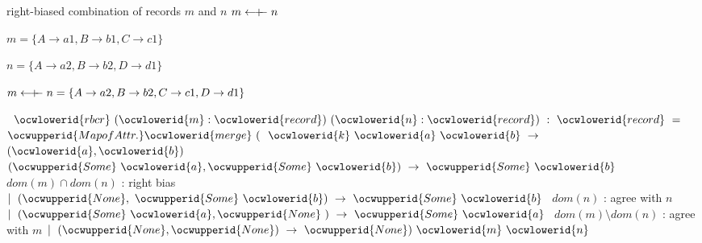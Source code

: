 \documentclass[12pt]{article}
\begin{document}
\ocwendcode{}\ocwindent{0.00em}
right-biased combination of records $m$ and $n$ 
\ocweol
\ocwindent{0.00em}
$m \mathrel{\leftarrow\mkern-7mu+\mkern-7mu-} n$

  $m =          \{ A \to a1, B \to b1, C \to c1\}$

  $n =          \{ A \to a2, B \to b2,          D \to d1\}$

  $m \mathrel{\leftarrow\mkern-7mu+\mkern-7mu-} n  = \{ A \to a2, B \to b2, C \to c1,D \to d1\}$

 
\ocweol
\label{rellens.ml:12776}%
\medskip
\ocwbegincode{}\ocwindent{0.00em}
~$\ocwlowerid{rbcr}~(\ocwlowerid{m}:\ocwlowerid{record})~(\ocwlowerid{n}:\ocwlowerid{record})~:~\ocwlowerid{record}~=~$\ocweol
\ocwindent{1.00em}
$\ocwupperid{MapofAttr.}\ocwlowerid{merge}~($~$\ocwlowerid{k}~\ocwlowerid{a}~\ocwlowerid{b}~\rightarrow{}~$~$(\ocwlowerid{a},\ocwlowerid{b})~$\ocweol
\ocwindent{1.00em}
$(\ocwupperid{Some}~\ocwlowerid{a},\ocwupperid{Some}~\ocwlowerid{b})~\rightarrow{}~\ocwupperid{Some}~\ocwlowerid{b}~$\ocwbc{} $dom(m) \cap  dom(n)$ : right bias \ocwec{}\ocweol
\ocwindent{0.00em}
$\mid{}~(\ocwupperid{None},~\ocwupperid{Some}~\ocwlowerid{b})~\rightarrow{}~\ocwupperid{Some}~\ocwlowerid{b}~$\ocwbc{}              $dom(n)$ : agree with $n$ \ocwec{}\ocweol
\ocwindent{0.00em}
$\mid{}~(\ocwupperid{Some}~\ocwlowerid{a},\ocwupperid{None}~)~\rightarrow{}~\ocwupperid{Some}~\ocwlowerid{a}~$\ocwbc{} $dom(m)\setminus dom(n)$ : agree with $m$ \ocwec{}\ocweol
\ocwindent{0.00em}
$\mid{}~(\ocwupperid{None},\ocwupperid{None})~\rightarrow{}~\ocwupperid{None})~\ocwlowerid{m}~\ocwlowerid{n}$\medskip
\end{document}
